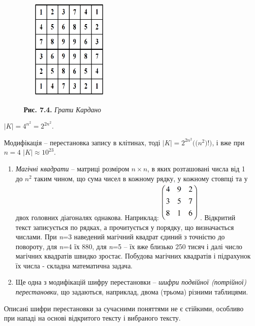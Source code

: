 \documentclass[a4paper]{article}
\newcounter{saveenum}
\newcommand\liststyleWWviiiNumxli{%
\renewcommand\theenumi{\arabic{enumi}}
\renewcommand\theenumii{\alph{enumii}}
\renewcommand\theenumiii{\roman{enumiii}}
\renewcommand\theenumiv{\arabic{enumiv}}
\renewcommand\labelenumi{\theenumi)}
\renewcommand\labelenumii{\theenumii.}
\renewcommand\labelenumiii{\theenumiii.}
\renewcommand\labelenumiv{\theenumiv.}
}
\newcounter{}
\begin{document}
\begin{figure}
\centering
\begin{minipage}{}
 \includegraphics[width=1.9374in,height=1.9374in]{crypt-img/crypt-img75.png} 
\end{minipage}
\end{figure}
\begin{figure}
\centering
\begin{minipage}{2.3575in}
{\centering
\textbf{Рис. 7.4. }\textit{Грати Кардано}
\par}
\end{minipage}
\end{figure}
{\centering
 ${|K|=4^{{n^{{2}}}}=2^{2n^{{2}}}}$.
\par}

Модифікація – перестановка запису в клітинах, тоді  
${|K|=2^{{2n^{{2}}}}((n^{2}{)!)}}$,  і вже при  ${n=4}$   ${|K|\approx
\text{10}^{{\text{23}}}}$.

\liststyleWWviiiNumxli
\setcounter{saveenum}{\value{enumi}}
\begin{enumerate}
\setcounter{enumi}{\value{saveenum}}
\item \textit{Магічні квадрати} – матриці розміром  ${n\times n}$, в яких
розташовані числа від 1 до  ${n^{{2}}}$ таким чином, що сума чисел в кожному
рядку, у кожному стовпці та у двох головних діагоналях однакова. Наприклад: 
\includegraphics[width=0.778in,height=0.778in]{crypt-img/crypt-img76.png} .
Відкритий текст записується по рядках, а прочитується у порядку, що
визначається числами. При \textit{n}=3 наведений магічний квадрат єдиний з
точністю до повороту, для \textit{n}=4  їх  880, для \textit{n}=5 – їх вже
близько 250 тисяч і далі число магічних квадратів швидко зростає. Побудова
магічних квадратів і підрахунок їх числа - складна математична задача. 
\item Ще одна з модифікацій шифру перестановки – \textit{шифри подвійної
(потрійної) перестановки}, що задаються, наприклад,  двома (трьома) різними
таблицями.
\end{enumerate}
 Описані шифри перестановки за сучасними поняттями  не є стійкими, особливо при
нападі на основі відкритого тексту і вибраного тексту.
\end{document}
